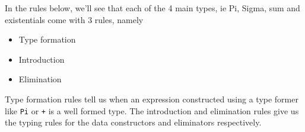 \documentclass{article}
\begin{document}

In the rules below, we'll see that each of the 4 main types, ie Pi, Sigma, sum
and existentials come with 3 rules, namely
\begin{itemize}[label=$\ast$]
  \item Type formation
  \item Introduction
  \item Elimination
\end{itemize}

Type formation rules tell us when an expression constructed using a type
former like \texttt{Pi} or \texttt{+} is a well formed type.
The introduction and elimination rules give us the typing rules for the data
constructors and eliminators respectively.
\end{document}
